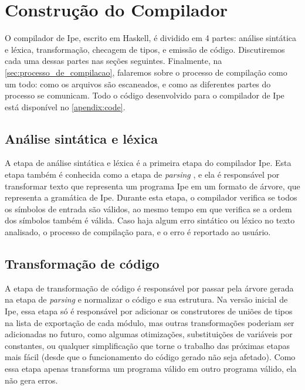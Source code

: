 

\chapter{Construção do Compilador}\label{chapter:construcao-do-compilador}

O compilador de Ipe, escrito em Haskell, é dividido em 4 partes: análise sintática e léxica,
transformação, checagem de tipos, e emissão de código. Discutiremos cada uma dessas partes nas seções
seguintes.  Finalmente, na \autoref{sec:processo_de_compilacao}, falaremos sobre o processo de
compilação como um todo: como os arquivos são escaneados, e como as diferentes partes do processo se
comunicam. Todo o código desenvolvido para o compilador de Ipe está disponível no \autoref{apendix:code}.

\section{Análise sintática e léxica}

A etapa de análise sintática e léxica é a primeira etapa do compilador Ipe. Esta etapa também é
conhecida como a etapa de \textit{parsing} \cite{dragonbook}, e ela é responsável por transformar texto que representa
um programa Ipe em um formato de árvore, que representa a gramática de Ipe. Durante esta etapa, o
compilador verifica se todos os símbolos de entrada são válidos, ao mesmo tempo em que verifica se a
ordem dos símbolos também é válida. Caso haja algum erro sintático ou léxico no texto analisado,
o processo de compilação para, e o erro é reportado ao usuário.


\section{Transformação de código}

A etapa de transformação de código é responsável por passar pela árvore gerada na etapa de
\textit{parsing} e normalizar o código e sua estrutura. Na versão inicial de Ipe, essa etapa só é
responsável por adicionar os construtores de uniões de tipos na lista de exportação de cada módulo,
mas outras transformações poderiam ser adicionadas no futuro, como algumas otimizações, substituições
de variáveis por constantes, ou qualquer simplificação que torne o trabalho das próximas etapas mais
fácil (desde que o funcionamento do código gerado não seja afetado). Como essa etapa apenas transforma
um programa válido em outro programa válido, ela não gera erros.

